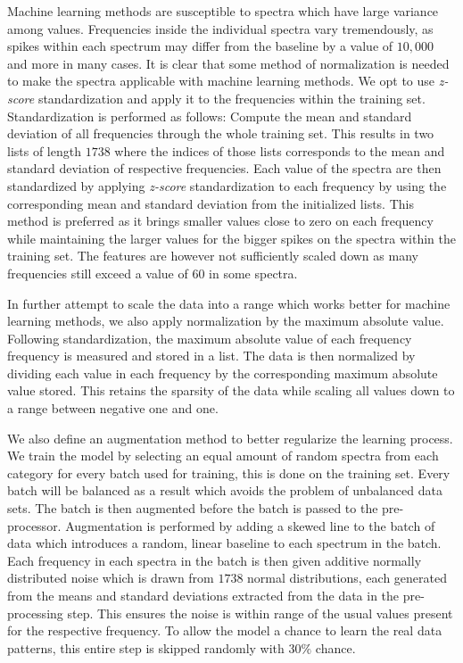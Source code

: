 Machine learning methods are susceptible to spectra which have large variance among values. Frequencies inside the individual spectra vary tremendously, as spikes within each spectrum may differ from the baseline by a value of $10,000$ and more in many cases. It is clear that some method of normalization is needed to make the spectra applicable with machine learning methods. We opt to use \textit{z-score} standardization and apply it to the frequencies within the training set. Standardization is performed as follows: Compute the mean and standard deviation of all frequencies through the whole training set. This results in two lists of length $1738$ where the indices of those lists corresponds to the mean and standard deviation of respective frequencies. Each value of the spectra are then standardized by applying \textit{z-score} standardization to each frequency by using the corresponding mean and standard deviation from the initialized lists. This method is preferred as it brings smaller values close to zero on each frequency while maintaining the larger values for the bigger spikes on the spectra within the training set. The features are however not sufficiently scaled down as many frequencies still exceed a value of $60$ in some spectra.

In further attempt to scale the data into a range which works better for machine learning methods, we also apply normalization by the maximum absolute value. Following standardization, the maximum absolute value of each frequency frequency is measured and stored in a list. The data is then normalized by dividing each value in each frequency by the corresponding maximum absolute value stored. This retains the sparsity of the data while scaling all values down to a range between negative one and one.

We also define an augmentation method to better regularize the learning process. We train the model by selecting an equal amount of random spectra from each category for every batch used for training, this is done on the training set. Every batch will be balanced as a result which avoids the problem of unbalanced data sets. The batch is then augmented before the batch is passed to the pre-processor. Augmentation is performed by adding a skewed line to the batch of data which introduces a random, linear baseline to each spectrum in the batch. Each frequency in each spectra in the batch is then given additive normally distributed noise which is drawn from $1738$ normal distributions, each generated from the means and standard deviations extracted from the data in the pre-processing step. This ensures the noise is within range of the usual values present for the respective frequency. To allow the model a chance to learn the real data patterns, this entire step is skipped randomly with $30\%$ chance.

